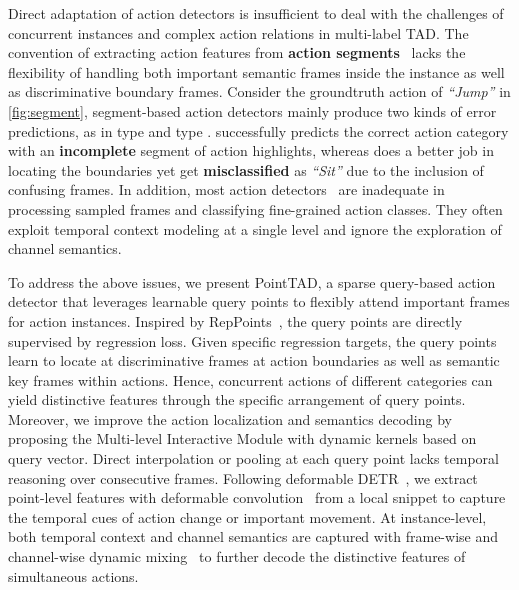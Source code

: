 \documentclass{article}
\begin{document}
Direct adaptation of action detectors is insufficient to deal with the challenges of concurrent instances and complex action relations in multi-label TAD. 
The convention of extracting action features from {\bf action segments}~\cite{DBLP:conf/cvpr/ChaoVSRDS18,DBLP:conf/cvpr/QingSGW0W0YGS21,DBLP:conf/iccv/ZengHGTRZH19,DBLP:journals/corr/abs-2109-08847} lacks the flexibility of handling both important semantic frames inside the instance as well as discriminative boundary frames. Consider the groundtruth action of {\em ``Jump''} in \cref{fig:segment}, segment-based action detectors mainly produce two kinds of error predictions, as in type  and type .  successfully predicts the correct action category with an {\bf incomplete} segment of action highlights, whereas  does a better job in locating the boundaries yet get {\bf misclassified} as {\em ``Sit''} due to the inclusion of confusing frames.  
In addition, most action detectors~\cite{DBLP:conf/iccv/ZengHGTRZH19,DBLP:conf/cvpr/QingSGW0W0YGS21, DBLP:journals/corr/abs-2106-10271} are inadequate in processing sampled frames and classifying fine-grained action classes. They often exploit temporal context modeling at a single level and ignore the exploration of channel semantics. 

To address the above issues, we present PointTAD, a sparse query-based action detector that leverages learnable query points to flexibly attend important frames for action instances. 
Inspired by RepPoints~\cite{DBLP:conf/iccv/YangLHWL19}, the query points are directly supervised by regression loss. Given specific regression targets, the query points learn to locate at discriminative frames at action boundaries as well as semantic key frames within actions. Hence, concurrent actions of different categories can yield distinctive features through the specific arrangement of query points. Moreover, we improve the action localization and semantics decoding by proposing the Multi-level Interactive Module with dynamic kernels based on query vector. Direct interpolation or pooling at each query point lacks temporal reasoning over consecutive frames. Following deformable DETR~\cite{DBLP:conf/iclr/ZhuSLLWD21}, we extract point-level features with deformable convolution~\cite{DBLP:conf/iccv/DaiQXLZHW17,DBLP:conf/cvpr/ZhuHLD19} from a local snippet to capture the temporal cues of action change or important movement. At instance-level, both temporal context and channel semantics are captured with frame-wise and channel-wise dynamic mixing~\cite{DBLP:conf/cvpr/SunZJKXZTLYW021,DBLP:journals/corr/abs-2203-16507} to further decode the distinctive features of simultaneous actions. 
\end{document}
